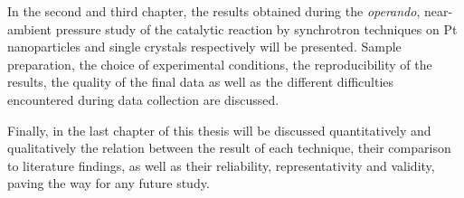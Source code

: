 In the second and third chapter, the results obtained during the \textit{operando}, near-ambient pressure study of the catalytic reaction by synchrotron techniques on Pt nanoparticles and single crystals respectively will be presented.
Sample preparation, the choice of experimental conditions, the reproducibility of the results, the quality of the final data as well as the different difficulties encountered during data collection are discussed.

Finally, in the last chapter of this thesis will be discussed quantitatively and qualitatively the relation between the result of each technique, their comparison to literature findings, as well as their reliability, representativity and validity, paving the way for any future study.